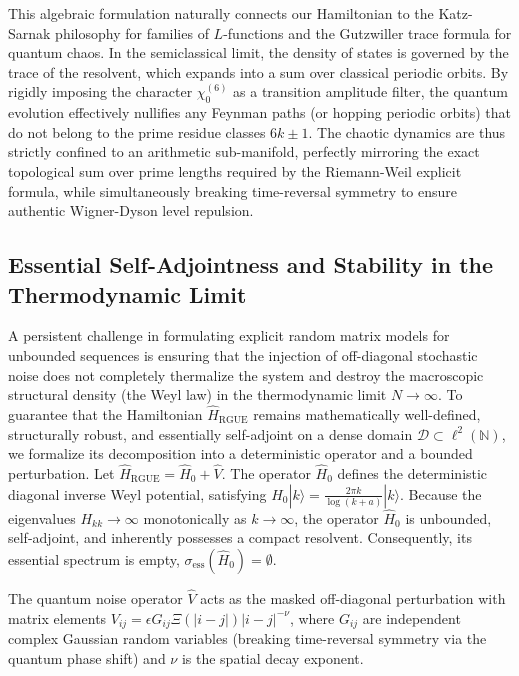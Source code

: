 \documentclass[prl,aps,floatfix,superscriptaddress,10pt]{revtex4-2}
\newcommand{\N}{\mathbb{N}}
\begin{document}
This algebraic formulation naturally connects our Hamiltonian to the Katz-Sarnak philosophy for families of $L$-functions and the Gutzwiller trace formula for quantum chaos.
In the semiclassical limit, the density of states is governed by the trace of the resolvent, which expands into a sum over classical periodic orbits.
By rigidly imposing the character $\chi_0^{(6)}$ as a transition amplitude filter, the quantum evolution effectively nullifies any Feynman paths (or hopping periodic orbits) that do not belong to the prime residue classes $6k \pm 1$.
The chaotic dynamics are thus strictly confined to an arithmetic sub-manifold, perfectly mirroring the exact topological sum over prime lengths required by the Riemann-Weil explicit formula, while simultaneously breaking time-reversal symmetry to ensure authentic Wigner-Dyson level repulsion.

\subsection{Essential Self-Adjointness and Stability in the Thermodynamic Limit}

A persistent challenge in formulating explicit random matrix models for unbounded sequences is ensuring that the injection of off-diagonal stochastic noise does not completely thermalize the system and destroy the macroscopic structural density (the Weyl law) in the thermodynamic limit $N \to \infty$.
To guarantee that the Hamiltonian $\hat{H}_{\text{RGUE}}$ remains mathematically well-defined, structurally robust, and essentially self-adjoint on a dense domain $\mathcal{D} \subset \ell^2(\N)$, we formalize its decomposition into a deterministic operator and a bounded perturbation.
Let $\hat{H}_{\text{RGUE}} = \hat{H}_0 + \hat{V}$. The operator $\hat{H}_0$ defines the deterministic diagonal inverse Weyl potential, satisfying $\hat{H}_0 |k\rangle = \frac{2\pi k}{\log(k+a)} |k\rangle$.
Because the eigenvalues $H_{kk} \to \infty$ monotonically as $k \to \infty$, the operator $\hat{H}_0$ is unbounded, self-adjoint, and inherently possesses a compact resolvent.
Consequently, its essential spectrum is empty, $\sigma_{\text{ess}}(\hat{H}_0) = \emptyset$.

The quantum noise operator $\hat{V}$ acts as the masked off-diagonal perturbation with matrix elements $V_{ij} = \epsilon G_{ij} \Xi(|i-j|) |i-j|^{-\nu}$, where $G_{ij}$ are independent complex Gaussian random variables (breaking time-reversal symmetry via the quantum phase shift) and $\nu$ is the spatial decay exponent.
\end{document}
